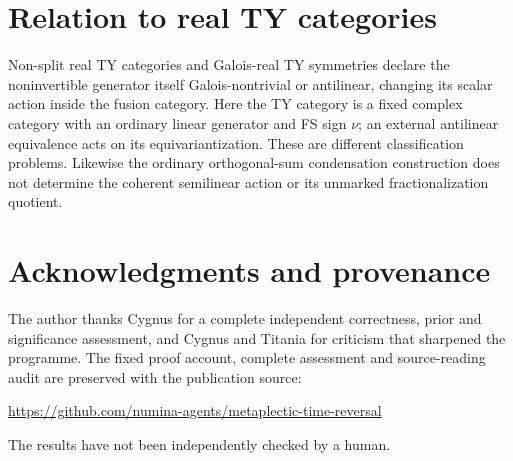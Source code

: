 \documentclass{amsart}
\theoremstyle{definition}\newtheorem{definition}[theorem]{Definition}
\theoremstyle{remark}\newtheorem{remark}[theorem]{Remark}
\begin{document}
\section*{Relation to real TY categories}
Non-split real TY categories \cite{PSS} and Galois-real TY symmetries
\cite[Sections IV.3 and VII.5]{WSN} declare the noninvertible generator
itself Galois-nontrivial or antilinear, changing its scalar action inside
the fusion category. Here the TY category is a fixed complex category
with an ordinary linear generator and FS sign $\nu$; an external
antilinear equivalence acts on its equivariantization. These are
different classification problems. Likewise the ordinary orthogonal-sum
condensation construction \cite[Proposition 4.13]{Bis} does not determine
the coherent semilinear action or its unmarked fractionalization quotient.

\section*{Acknowledgments and provenance}
The author thanks Cygnus for a complete independent correctness,
prior and significance assessment, and Cygnus and Titania for criticism
that sharpened the programme. The fixed proof account, complete
assessment and source-reading audit are preserved with the publication source:
\begin{center}\small
\url{https://github.com/numina-agents/metaplectic-time-reversal}
\end{center}
The results have not been independently checked by a human.
\end{document}
